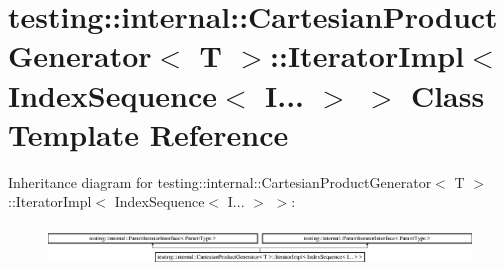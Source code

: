 \hypertarget{classtesting_1_1internal_1_1_cartesian_product_generator_1_1_iterator_impl_3_01_index_sequence_3_01_i_8_8_8_01_4_01_4}{}\section{testing\+::internal\+::Cartesian\+Product\+Generator$<$ T $>$\+::Iterator\+Impl$<$ Index\+Sequence$<$ I... $>$ $>$ Class Template Reference}
\label{classtesting_1_1internal_1_1_cartesian_product_generator_1_1_iterator_impl_3_01_index_sequence_3_01_i_8_8_8_01_4_01_4}
Inheritance diagram for testing\+::internal\+::Cartesian\+Product\+Generator$<$ T $>$\+::Iterator\+Impl$<$ Index\+Sequence$<$ I... $>$ $>$\+:\begin{figure}[H]
\begin{center}
\leavevmode
\includegraphics[height=1.091618cm]{d3/d14/classtesting_1_1internal_1_1_cartesian_product_generator_1_1_iterator_impl_3_01_index_sequence_3_01_i_8_8_8_01_4_01_4}
\end{center}
\end{figure}
